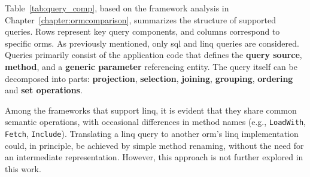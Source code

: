 Table~\ref{tab:query_comp}, based on the framework analysis in Chapter~\ref{chapter:ormcomparison}, summarizes the structure of supported queries. Rows represent key query components, and columns correspond to specific \acrshort{orm}s. As previously mentioned, only \acrshort{sql} and \acrshort{linq} queries are considered. Queries primarily consist of the application code that defines the \textbf{query source}, \textbf{method}, and a \textbf{generic parameter} referencing entity. The query itself can be decomposed into parts: \textbf{projection}, \textbf{selection}, \textbf{joining}, \textbf{grouping}, \textbf{ordering} and \textbf{set operations}. 

Among the frameworks that support \acrshort{linq}, it is evident that they share common semantic operations, with occasional differences in method names (e.g., \texttt{LoadWith}, \texttt{Fetch}, \texttt{Include}). Translating a \acrshort{linq} query to another \acrshort{orm}'s \acrshort{linq} implementation could, in principle, be achieved by simple method renaming, without the need for an intermediate representation. However, this approach is not further explored in this work.

